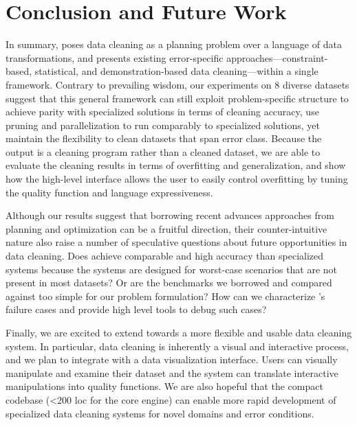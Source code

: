 \section{Conclusion and Future Work}
In summary, \sys poses data cleaning as a planning problem over a language of data transformations, and presents existing error-specific approaches---constraint-based, statistical, and demonstration-based data cleaning---within a single framework.
Contrary to prevailing wisdom, our experiments on 8 diverse datasets suggest that this general framework can still exploit problem-specific structure to achieve parity with specialized solutions in terms of cleaning accuracy, use pruning and parallelization to run comparably to specialized solutions, yet maintain the flexibility to clean datasets that span error class.       
Because the output is a cleaning program rather than a cleaned dataset, we are able to evaluate the cleaning results in terms of overfitting and generalization, and show how the high-level interface allows the user to easily control overfitting by tuning the quality function and language expressiveness.  

Although our results suggest that borrowing recent advances approaches from planning and optimization can be a fruitful direction, their counter-intuitive nature also raise a number of speculative questions about future opportunities in data cleaning.  Does \sys achieve comparable and high accuracy than specialized systems because the systems are designed for worst-case scenarios that are not present in most datasets?  Or are the benchmarks we borrowed and compared against too simple for our problem formulation?  How can we characterize \sys's failure cases and provide high level tools to debug such cases?  

Finally, we are excited to extend \sys towards a more flexible and usable data cleaning system.  In particular, data cleaning is inherently a visual and interactive process, and we plan to integrate \sys with a data visualization interface.   Users can visually manipulate and examine their dataset and the system can translate interactive manipulations into quality functions.  We are also hopeful that the compact codebase (<200 loc for the core engine) can enable more rapid development of specialized data cleaning systems for novel domains and error conditions.  



